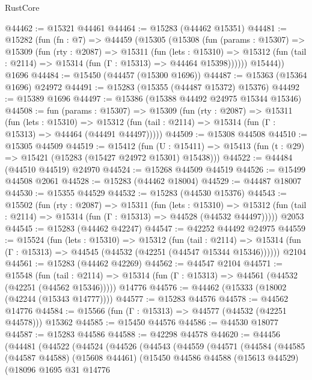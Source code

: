 \begin{lexlean}{RustCore}
\begin{coremodule}
@44462 := @15321 @44461
@44464 := @15283 (@44462 @15351)
@44481 := @15282
    (fun (fn : @7) =>
    @44459
      (@15305
        (@15308
          (fun (params : @15307) =>
          @15309
            (fun (rty : @2087) =>
            @15311
              (fun (lets : @15310) =>
              @15312 (fun (tail : @2114) => @15314 (fun (Γ : @15313) => @44464 @15398))))))
        @15444))
    @1696
@44484 := @15450 (@44457 (@15300 @1696))
@44487 := @15363 (@15364 @1696) @24972
@44491 := @15283 (@15355 (@44487 @15372) @15376)
@44492 := @15389 @1696
@44497 := @15386 (@15388 @44492 @24975 @15344 @15346)
@44508 := fun (params : @15307) =>
  @15309
    (fun (rty : @2087) =>
    @15311
      (fun (lets : @15310) =>
      @15312 (fun (tail : @2114) => @15314 (fun (Γ : @15313) => @44464 (@44491 @44497)))))
@44509 := @15308 @44508
@44510 := @15305 @44509
@44519 := @15412
    (fun (U : @15411) => @15413 (fun (t : @29) => @15421 (@15283 (@15427 @24972 @15301) @15438)))
@44522 := @44484 (@44510 @44519) @24970
@44524 := @15268 @44509 @44519
@44526 := @15499 @44508 @2061
@44528 := @15283 (@44462 @18004)
@44529 := @44487 @18007
@44530 := @15355 @44529
@44532 := @15283 (@44530 @15376)
@44543 := @15502
    (fun (rty : @2087) =>
    @15311
      (fun (lets : @15310) =>
      @15312 (fun (tail : @2114) => @15314 (fun (Γ : @15313) => @44528 (@44532 @44497)))))
    @2053
@44545 := @15283 (@44462 @42247)
@44547 := @42252 @44492 @24975
@44559 := @15524
    (fun (lets : @15310) =>
    @15312
      (fun (tail : @2114) =>
      @15314 (fun (Γ : @15313) => @44545 (@44532 (@42251 (@44547 @15344 @15346))))))
    @2104
@44561 := @15283 (@44462 @42269)
@44562 := @44547 @2104
@44571 := @15548
    (fun (tail : @2114) => @15314 (fun (Γ : @15313) => @44561 (@44532 (@42251 (@44562 @15346)))))
    @14776
@44576 := @44462 (@15333 (@18002 (@42244 (@15343 @14777))))
@44577 := @15283 @44576
@44578 := @44562 @14776
@44584 := @15566 (fun (Γ : @15313) => @44577 (@44532 (@42251 @44578))) @15362
@44585 := @15450 @44576
@44586 := @44530 @18077
@44587 := @15283 @44586
@44588 := @42298 @44578
@44620 := @44456
    (@44481
      (@44522
        (@44524
          (@44526
            (@44543
              (@44559
                (@44571
                  (@44584
                    (@44585
                      (@44587 @44588)
                      (@15608 @44461)
                      (@15450
                        @44586
                        @44588
                        (@15613 @44529)
                        (@18096
                          @1695
                          @31
                          @14776

\end{coremodule}
\end{lexlean}
